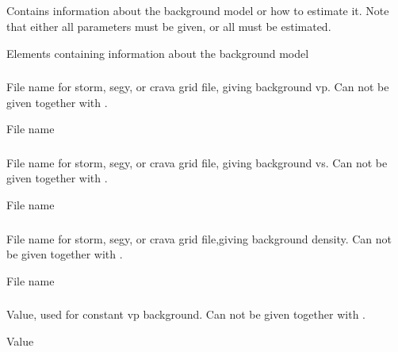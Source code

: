 \subsection{}
 \slist
   \item \Description Contains information about the background model or how to estimate it. Note that either all parameters must be given, or all must be estimated.
   \item \Argument Elements containing information about the background model
   \item \Default
 \elist

\subsubsection{}
 \slist
   \item \Description File name for storm, segy, or crava grid file, giving background vp. Can not be given together with .
   \item \Argument File name
   \item \Default
 \elist

\subsubsection{}
 \slist
   \item \Description File name for storm, segy, or crava grid file, giving background vs. Can not be given together with .
   \item \Argument File name
   \item \Default
 \elist

\subsubsection{}
 \slist
   \item \Description File name for storm, segy, or crava grid file,giving background density. Can not be given together with .
   \item \Argument File name
   \item \Default
 \elist

\subsubsection{}
 \slist
   \item \Description Value, used for constant vp background. Can not be given together with .
   \item \Argument Value
   \item \Default
 \elist

